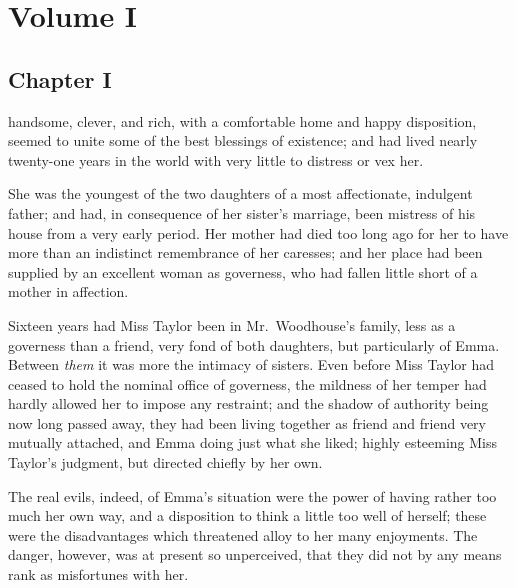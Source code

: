 











\part{Volume I}



\chapter{Chapter I}


 handsome, clever, and rich, with a comfortable home
and happy disposition, seemed to unite some of the best blessings
of existence; and had lived nearly twenty-one years in the world
with very little to distress or vex her.

She was the youngest of the two daughters of a most affectionate,
indulgent father; and had, in consequence of her sister's marriage,
been mistress of his house from a very early period.  Her mother
had died too long ago for her to have more than an indistinct
remembrance of her caresses; and her place had been supplied
by an excellent woman as governess, who had fallen little short
of a mother in affection.

Sixteen years had Miss Taylor been in Mr.\ Woodhouse's family,
less as a governess than a friend, very fond of both daughters,
but particularly of Emma.  Between \emph{them} it was more the intimacy
of sisters.  Even before Miss Taylor had ceased to hold the nominal
office of governess, the mildness of her temper had hardly allowed
her to impose any restraint; and the shadow of authority being
now long passed away, they had been living together as friend and
friend very mutually attached, and Emma doing just what she liked;
highly esteeming Miss Taylor's judgment, but directed chiefly by
her own.

The real evils, indeed, of Emma's situation were the power of having
rather too much her own way, and a disposition to think a little
too well of herself; these were the disadvantages which threatened
alloy to her many enjoyments.  The danger, however, was at present
so unperceived, that they did not by any means rank as misfortunes
with her.

